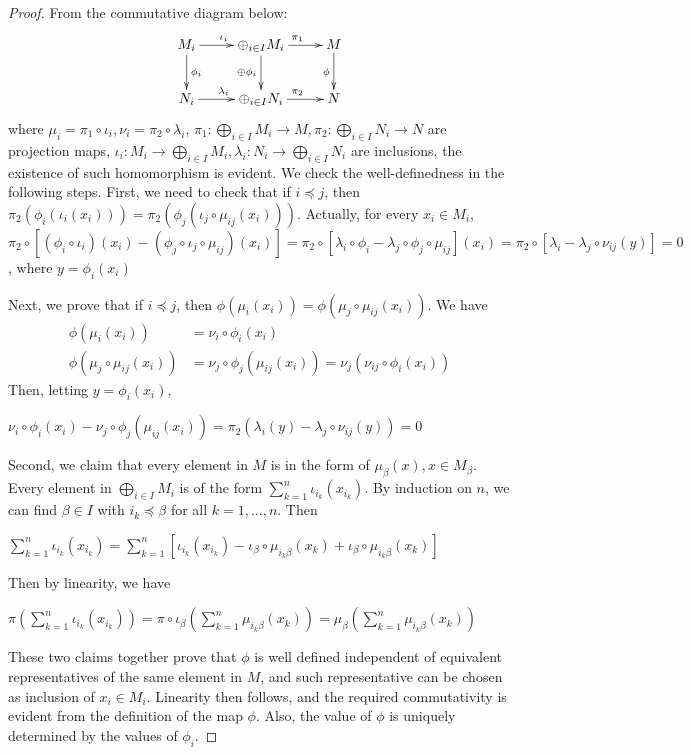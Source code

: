 \begin{proof}
From the commutative diagram below:
\[ \xymatrix{
    M_i \ar[r]^{\iota_i} \ar[d]^{\phi_i}&\oplus_{i\in I} M_i\ar[r]^{\pi_1} 
\ar[d]_{\oplus\phi_i}
    &M \ar[d]_{\phi}\\
    N_i \ar[r]^{\lambda_i} &\oplus_{i\in I} N_i \ar[r]^{\pi_2} &N
    }
\]
where $\mu_{i}=\pi_1 \circ \iota_{i}, \nu_{i}=\pi_2 \circ \lambda_{i}$, 
$\pi_1:\bigoplus_{i\in I}M_i\rightarrow M,
\pi_2:\bigoplus_{i\in I}N_i\rightarrow N$ are projection maps,
$\iota_i:M_i\rightarrow 
\bigoplus_{i\in I}M_i, \lambda_{i}:N_i\rightarrow
\bigoplus_{i\in I}N_i$ are inclusions, the existence of such homomorphism is 
evident. We check the
well-definedness in the following steps.
First, we need to check that if $i\preceq j$, then
$\pi_2(\phi_i(\iota_i(x_i)))=\pi_2(\phi_j(\iota_j\circ\mu_{ij}(x_i)))$. 
Actually, for every $x_i\in M_i$,\\
$\pi_2\circ[(\phi_i\circ\iota_i)(x_i)-(\phi_j\circ\iota_j\circ\mu_{ij})(x_i)] = 
\pi_2\circ[\lambda_i\circ\phi_i-\lambda_j\circ\phi_j\circ\mu_{ij}](x_i) 
=\pi_2\circ[\lambda_i-\lambda_j\circ\nu_{ij}(y)]=0$, where $y=\phi_i(x_i)$

\medskip\noindent
Next, we prove that if $i\preceq j$, then 
$\phi(\mu_i(x_i))=\phi(\mu_j\circ\mu_{ij}(x_i))$. We have
\begin{align}
\phi(\mu_i(x_i))&= \nu_i\circ\phi_i(x_i)\\
\phi(\mu_j\circ\mu_{ij}(x_i))&= \nu_j\circ\phi_j(\mu_{ij}(x_i))= 
\nu_j(\nu_{ij}\circ\phi_i(x_i))
\end{align}
Then, letting $y=\phi_i(x_i)$,
\begin{center}
$\nu_i\circ\phi_i(x_i)-\nu_j\circ\phi_j(\mu_{ij}(x_i))=
\pi_2(\lambda_i(y)-\lambda_j\circ\nu_{ij}(y))=0$
\end{center}
Second, we claim that every element in $M$ is in the form of $\mu_{\beta}(x), 
x\in M_{\beta}$. Every element in
$\bigoplus_{i\in I}M_i$ is of the form $\sum_{k=1}^n \iota_{i_k}(x_{i_k})$. By 
induction on $n$, we can find
$\beta\in I$ with $i_k\preceq\beta$ for all $k=1,...,n$. Then
\begin{center} 
$\sum_{k=1}^n
\iota_{i_k}(x_{i_k})=\sum_{k=1}^n
[\iota_{i_k}(x_{i_k}) - \iota_{\beta}\circ\mu_{i_{k}\beta}(x_k)
+ \iota_{\beta} \circ \mu_{i_{k}\beta}(x_k)]$
\end{center}
Then by linearity, we have
\begin{center}
$\pi( \sum_{k=1}^n \iota_{i_k}(x_{i_k}))
= \pi \circ \iota_{\beta}(\sum_{k=1}^n  \mu_{i_{k} \beta}(x_k))
= \mu_{\beta}(\sum_{k=1}^n \mu_{i_{k}\beta}(x_k))$
\end{center}
These two claims together prove that $\phi$ is well defined independent of 
equivalent representatives of the
same element in $M$, and such representative can be chosen as inclusion of 
$x_i\in M_i$. Linearity then follows,
and the required commutativity is
evident from the definition of the map $\phi$.
Also, the value of $\phi$ is uniquely determined by the values of $\phi_i$.
\end{proof}

